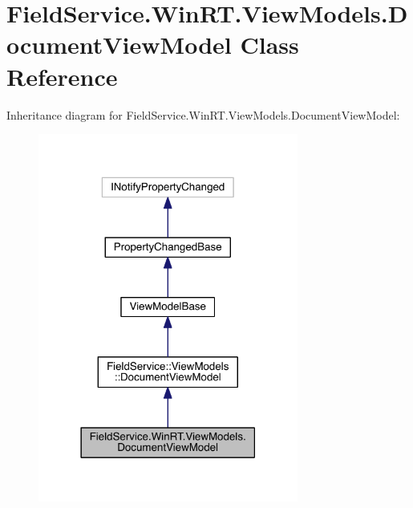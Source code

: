 \hypertarget{class_field_service_1_1_win_r_t_1_1_view_models_1_1_document_view_model}{\section{Field\+Service.\+Win\+R\+T.\+View\+Models.\+Document\+View\+Model Class Reference}
\label{class_field_service_1_1_win_r_t_1_1_view_models_1_1_document_view_model}
}


Inheritance diagram for Field\+Service.\+Win\+R\+T.\+View\+Models.\+Document\+View\+Model\+:
\nopagebreak
\begin{figure}[H]
\begin{center}
\leavevmode
\includegraphics[width=242pt]{class_field_service_1_1_win_r_t_1_1_view_models_1_1_document_view_model__inherit__graph}
\end{center}
\end{figure}


